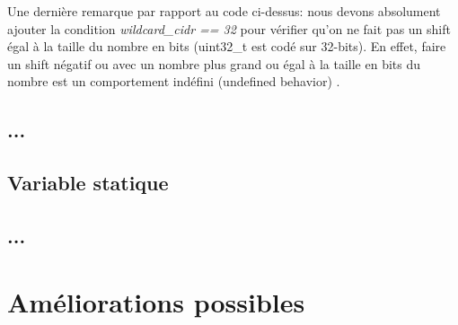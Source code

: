 \documentclass[a4paper]{article}
\begin{document}
Une dernière remarque par rapport au code ci-dessus: nous devons absolument ajouter la condition \textit{wildcard\_cidr == 32} pour vérifier qu'on ne fait pas un shift égal à la taille du nombre en bits (uint32\_t est codé sur 32-bits). En effet, faire un shift négatif ou avec un nombre plus grand ou égal à la taille en bits du nombre est un comportement indéfini (undefined behavior) \cite{9}.





\subsection{...}








\subsection{Variable statique}








\subsection{...}













\section{Améliorations possibles}
\end{document}
